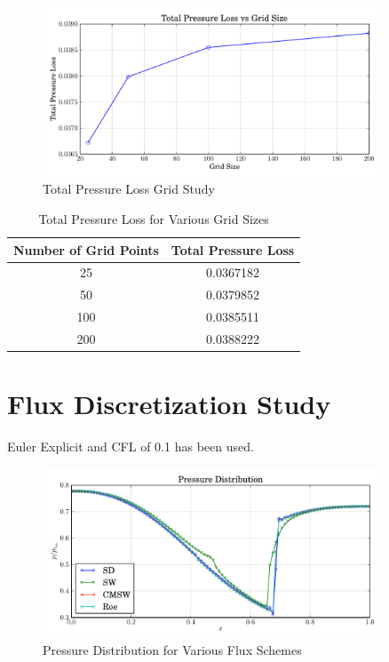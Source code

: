 \documentclass[letterpaper,12pt,]{article}
\begin{document}
\begin{figure}[!ht]
    \centering
    \includegraphics[width = 0.9\textwidth]{./figures/q3loss.pdf}
    \caption {Total Pressure Loss Grid Study}
    \label{fig:q3loss}
\end{figure}

\begin{table}[!h]
\centering
\begin{tabular}{cc} \toprule
    {Number of Grid Points} & {Total Pressure Loss} \\
    \midrule
    {25}  & 0.0367182\\
    {50}  & 0.0379852\\
    {100} & 0.0385511\\
    {200} & 0.0388222\\
\bottomrule
\end{tabular}
\caption{Total Pressure Loss for Various Grid Sizes}
\label{tab1}
\end{table}

\section{Flux Discretization Study}

Euler Explicit and CFL of 0.1 has been used.

\begin{figure}[!ht]
    \centering
    \includegraphics[width = 0.9\textwidth]{./figures/q4p.pdf}
    \caption {Pressure Distribution for Various Flux Schemes}
    \label{fig:q4p}
\end{figure}
\end{document}

